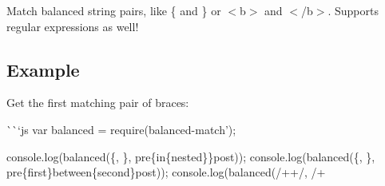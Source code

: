 Match balanced string pairs, like {\ttfamily \{} and {\ttfamily \}} or {\ttfamily $<$b$>$} and {\ttfamily $<$/b$>$}. Supports regular expressions as well!

\href{http://travis-ci.org/juliangruber/balanced-match}{\tt } \href{https://www.npmjs.org/package/balanced-match}{\tt }

\href{https://ci.testling.com/juliangruber/balanced-match}{\tt }

\subsection*{Example}

Get the first matching pair of braces\+:

\`{}\`{}`js var balanced = require(\textquotesingle{}balanced-\/match');

console.\+log(balanced(\textquotesingle{}\{\textquotesingle{}, \textquotesingle{}\}\textquotesingle{}, \textquotesingle{}pre\{in\{nested\}\}post\textquotesingle{})); console.\+log(balanced(\textquotesingle{}\{\textquotesingle{}, \textquotesingle{}\}\textquotesingle{}, \textquotesingle{}pre\{first\}between\{second\}post\textquotesingle{})); console.\+log(balanced(/++/, /+ 